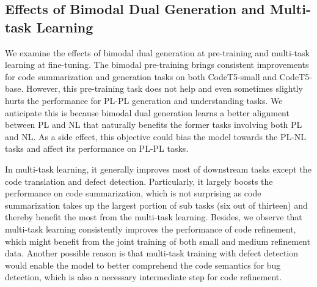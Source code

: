 \documentclass[11pt]{article}
\begin{document}
\begin{table}[t]
\centering
{}
\vspace{-0.5em}
\caption{Ablation study with CodeT5-small on four selected tasks. ``Sum-PY'' denotes   code summarization  on Python and ``Code-Gen'' denotes  code generation.}

\label{table:ablation}
\vspace{-1em}
\end{table}

 
\subsection{Effects of Bimodal Dual Generation and Multi-task Learning} \label{sec:dual_gen_multi_task}
We  examine the effects of bimodal dual generation at pre-training and multi-task learning at  fine-tuning. The bimodal pre-training brings consistent improvements for code summarization and generation tasks on both CodeT5-small and CodeT5-base. 
However, this pre-training task does not help and even sometimes slightly hurts the performance for  PL-PL generation  and understanding tasks. We anticipate this is because bimodal dual generation learns a better alignment between PL and NL that naturally benefits the former tasks involving both PL and NL.
As a side effect, this objective could  bias the model towards the PL-NL tasks and affect its performance on PL-PL tasks.

In multi-task learning, it generally improves most of downstream tasks except the code translation and defect detection.
Particularly, it largely boosts the performance on code summarization, which is not surprising as code summarization  takes up the largest portion of sub tasks (six out of thirteen) and thereby benefit the most from the multi-task learning. 
Besides, we observe that multi-task learning consistently improves the performance of code refinement, which might benefit from the joint training of both small and medium refinement data.
Another possible reason is that  multi-task training with defect detection would enable the model to better comprehend the code semantics for bug detection, which is also a necessary intermediate step for  code refinement.
\end{document}

